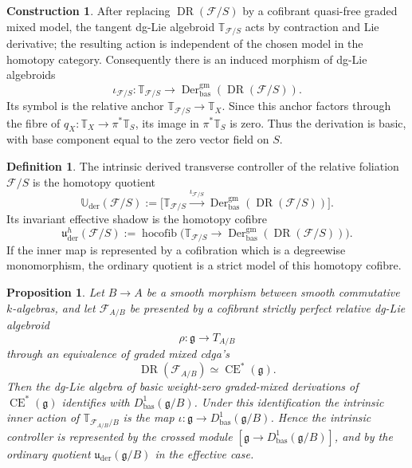 \documentclass[11pt,reqno,a4paper,dvipsnames,x11names]{amsart}
\numberwithin{equation}{section}
\theoremstyle{plain}
\newtheorem{proposition}[theorem]{Proposition}
\theoremstyle{definition}
\newtheorem{definition}[theorem]{Definition}
\newtheorem{construction}[theorem]{Construction}
\theoremstyle{remark}
\DeclareMathOperator{\Der}{Der}
\DeclareMathOperator{\hocofib}{hocofib}
\DeclareMathOperator{\CE}{CE}
\DeclareMathOperator{\DR}{DR}
\newcommand{\kk}{k}
\newcommand{\cF}{\mathcal F}
\newcommand{\g}{\mathfrak g}
\newcommand{\uuder}{\mathfrak u_{\mathrm{der}}}
\newcommand{\Uder}{\mathbb U_{\mathrm{der}}}
\newcommand{\bbT}{\mathbb T}
\newcommand{\xto}[1]{\xrightarrow{#1}}
\newcommand{\gm}{\mathrm{gm}}
\newcommand{\bas}{\mathrm{bas}}
\newcommand{\from}{\colon}
\begin{document}
\begin{construction}\label{cons:inner-action}
After replacing \(\DR(\cF/S)\) by a cofibrant quasi-free graded mixed model, the tangent dg-Lie algebroid \(\bbT_{\cF/S}\) acts by contraction and Lie derivative; the resulting action is independent of the chosen model in the homotopy category. Consequently there is an induced morphism of dg-Lie algebroids
\[
 \iota_{\cF/S}\from \bbT_{\cF/S}\longrightarrow \Der^{\gm}_{\bas}(\DR(\cF/S)).
\]
Its symbol is the relative anchor \(\bbT_{\cF/S}\to \bbT_X\). Since this anchor factors through the fibre of \(q_X\from\bbT_X\to\pi^*\bbT_S\), its image in \(\pi^*\bbT_S\) is zero. Thus the derivation is basic, with base component equal to the zero vector field on \(S\).
\end{construction}

\begin{definition}\label{def:intrinsic-controller}
The intrinsic derived transverse controller of the relative foliation \(\cF/S\) is the homotopy quotient
\[
 \Uder(\cF/S):=
 \bigl[\bbT_{\cF/S}\xto{\iota_{\cF/S}}\Der^{\gm}_{\bas}(\DR(\cF/S))\bigr].
\]
Its invariant effective shadow is the homotopy cofibre
\[
 \uuder^{h}(\cF/S):=
 \hocofib\bigl(
 \bbT_{\cF/S}\to
 \Der^{\gm}_{\bas}(\DR(\cF/S))
 \bigr).
\]
If the inner map is represented by a cofibration which is a degreewise monomorphism, the ordinary quotient is a strict model of this homotopy cofibre.
\end{definition}

\begin{proposition}\label{prop:intrinsic-comparison}
Let \(B\to A\) be a smooth morphism between smooth commutative \(\kk\)-algebras, and let \(\cF_{A/B}\) be presented by a cofibrant strictly perfect relative dg-Lie algebroid
\[
 \rho\from\g\longrightarrow T_{A/B}
\]
through an equivalence of graded mixed cdga's
\[
 \DR(\cF_{A/B})\simeq\CE^*(\g).
\]
Then the dg-Lie algebra of basic weight-zero graded-mixed derivations of \(\CE^*(\g)\) identifies with \(D^1_{\bas}(\g/B)\). Under this identification the intrinsic inner action of \(\bbT_{\cF_{A/B}/B}\) is the map \(\iota\from\g\to D^1_{\bas}(\g/B)\). Hence the intrinsic controller is represented by the crossed module \([\g\to D^1_{\bas}(\g/B)]\), and by the ordinary quotient \(\uuder(\g/B)\) in the effective case.
\end{proposition}
\end{document}
